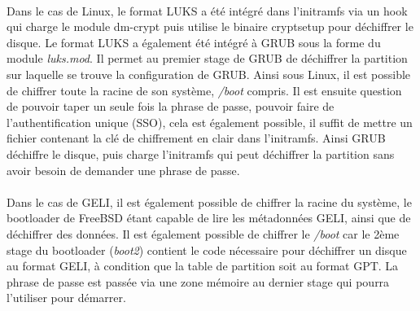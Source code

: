 \paragraph{}
Dans le cas de Linux, le format LUKS a été intégré dans l'initramfs via un
hook qui charge le module dm-crypt puis utilise le binaire cryptsetup pour 
déchiffrer le disque. Le format LUKS a également été intégré à GRUB sous la 
forme du module {\em luks.mod}. Il permet au premier stage de GRUB de 
déchiffrer la partition sur laquelle se trouve la configuration de GRUB.
Ainsi sous Linux, il est possible de chiffrer toute la racine de son système,
{\em /boot} compris. Il est ensuite question de pouvoir taper un seule fois la 
phrase de passe, pouvoir faire de l'authentification unique (SSO), cela est 
également possible, il suffit de mettre un fichier contenant la clé de 
chiffrement en clair dans l'initramfs. Ainsi GRUB déchiffre le disque, 
puis charge l'initramfs qui peut déchiffrer la partition sans avoir besoin 
de demander une phrase de passe.

\paragraph{}
Dans le cas de GELI, il est également possible de chiffrer la racine du 
système, le bootloader de FreeBSD étant capable de lire les métadonnées GELI, 
ainsi que de déchiffrer des données. Il est également possible de chiffrer le 
{\em /boot} car le 2ème stage du bootloader ({\em boot2}) contient le code 
nécessaire pour déchiffrer un disque au format GELI, à condition que la table 
de partition soit au format GPT. La phrase de passe est passée via une zone 
mémoire au dernier stage qui pourra l'utiliser pour démarrer.

